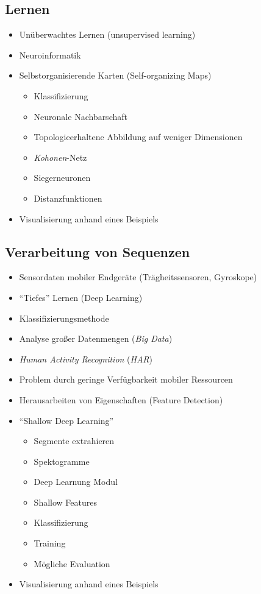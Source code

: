 \documentclass[11pt]{article}
\begin{document}
    \subsection{Lernen}

    \begin{itemize}
        \item Unüberwachtes Lernen (unsupervised learning)
        \item Neuroinformatik
        \item Selbstorganisierende Karten (Self-organizing Maps)
        \begin{itemize}
            \item Klassifizierung
            \item Neuronale Nachbarschaft
            \item Topologieerhaltene Abbildung auf weniger Dimensionen
            \item \textit{Kohonen}-Netz
            \item Siegerneuronen
            \item Distanzfunktionen
        \end{itemize}
        \item Visualisierung anhand eines Beispiels
    \end{itemize}

    \subsection{Verarbeitung von Sequenzen}

    \begin{itemize}
        \item Sensordaten mobiler Endgeräte (Trägheitssensoren, Gyroskope)
        \item "`Tiefes"' Lernen (Deep Learning)
        \item Klassifizierungsmethode
        \item Analyse großer Datenmengen (\textit{Big Data})
        \item \textit{Human Activity Recognition} (\textit{HAR})
        \item Problem durch geringe Verfügbarkeit mobiler Ressourcen
        \item Herausarbeiten von Eigenschaften (Feature Detection)
        \item "`Shallow Deep Learning"'
        \begin{itemize}
            \item Segmente extrahieren
            \item Spektogramme
            \item Deep Learnung Modul
            \item Shallow Features
            \item Klassifizierung
            \item Training
            \item Mögliche Evaluation
        \end{itemize}
        \item Visualisierung anhand eines Beispiels
    \end{itemize}
    \newpage
\end{document}
